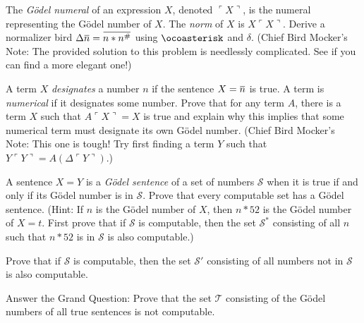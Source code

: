\documentclass[12pt, letterpaper]{article}
\begin{document}
\begin{prob}{25.2}
The \emph{G\"odel numeral} of an expression $X$, denoted $\ulcorner X \urcorner$, is the numeral representing the G\"odel number of $X$. The \emph{norm} of $X$ is $X\ulcorner X \urcorner$. Derive a normalizer bird $\Delta \noverline{n} = \noverline{n \ast n^\#}$ using $\ocoasterisk$ and $\delta$. (Chief Bird Mocker's Note: The provided solution to this problem is needlessly complicated. See if you can find a more elegant one!)
\end{prob}

\begin{prob}{25.3}
A term $X$ \emph{designates} a number $n$ if the sentence $X = \noverline{n}$ is true. A term is \emph{numerical} if it designates some number. Prove that for any term $A$, there is a term $X$ such that $A\ulcorner X \urcorner = X$ is true and explain why this implies that some numerical term must designate its own G\"odel number. (Chief Bird Mocker's Note: This one is tough! Try first finding a term $Y$ such that $Y\ulcorner Y \urcorner = A(\Delta \ulcorner Y \urcorner)$.)
\end{prob}

\begin{prob}{25.4}
A sentence $X = Y$ is a \emph{G\"odel sentence} of a set of numbers $\mathscr{S}$ when it is true if and only if its G\"odel number is in $\mathscr{S}$. Prove that every computable set has a G\"odel sentence. (Hint: If $n$ is the G\"odel number of $X$, then $n \ast 52$ is the G\"odel number of $X = t$. First prove that if $\mathscr{S}$ is computable, then the set $\mathscr{S}^*$ consisting of all $n$ such that $n \ast 52$ is in $\mathscr{S}$ is also computable.)
\end{prob}

\begin{prob}{25.5}
Prove that if $\mathscr{S}$ is computable, then the set $\mathscr{S}'$ consisting of all numbers not in $\mathscr{S}$ is also computable.
\end{prob}

\begin{prob}{25.6}
Answer the Grand Question: Prove that the set $\mathscr{T}$ consisting of the  G\"odel numbers of all true sentences is not computable.
\end{prob}
\end{document}

